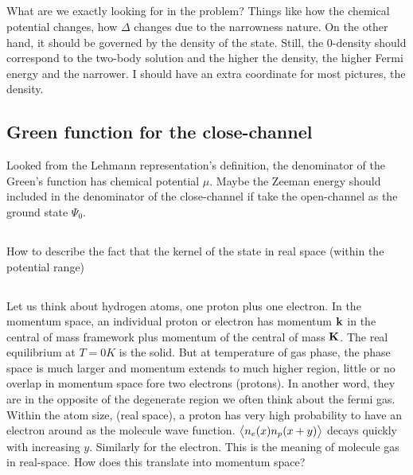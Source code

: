 \subsection{}
What are we exactly looking for in the problem? Things like how the chemical potential changes, how $\Delta$ changes due to the narrowness nature.  On the other hand, it should be governed by the density of the state.  Still, the 0-density should correspond to the two-body solution and the higher the density, the higher Fermi energy and the narrower.  I should have an extra coordinate for most pictures, the density.  

\subsection{Green function for the close-channel}
Looked from the Lehmann representation's definition,  the denominator of the Green's function has chemical potential $\mu$. Maybe the Zeeman energy should included in the denominator of the close-channel if take the open-channel as the ground state $\Psi_{0}$.  

\subsection{}
How to describe the fact that the kernel of the state in real space (within the potential range) 

\subsection{}
Let us think about hydrogen atoms, one proton plus one electron.  In the momentum space, an individual proton or electron has momentum $\mathbf{k}$ in the central of mass framework plus momentum of the central of mass  $\mathbf{K}$.  The real equilibrium at $T=0K$ is the solid.  But at temperature of  gas phase, the phase space is much larger and momentum extends to much higher region, little or no overlap in momentum space fore two electrons (protons).  In another word, they are in the opposite of the degenerate region we often think about the fermi gas.  Within the atom size, (real space), a proton has very high probability to have an electron around as the molecule wave function.  $\bigl<{n_{e}(x)n_{p}(x+y)}\bigr>$ decays quickly with increasing $y$.  Similarly for the electron.  This is the meaning of molecule gas in real-space.  How does this translate into momentum space? \be